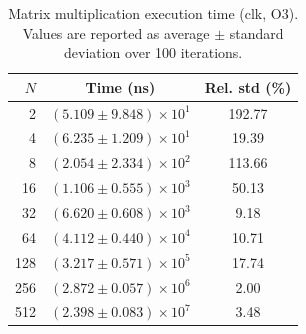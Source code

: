 \begin{table}[ht]
    \centering
    \caption{Matrix multiplication execution time (clk, O3). Values are reported as average $\pm$ standard deviation over 100 iterations.}
    \label{tab:mm-clk-o3}
    \begin{tabular}{rcc}
        \hline
        $N$ & Time (ns) & Rel. std (\%) \\
        \hline
        2 & $(5.109 \pm 9.848) \times 10^{1}$ & 192.77 \\
        4 & $(6.235 \pm 1.209) \times 10^{1}$ & 19.39 \\
        8 & $(2.054 \pm 2.334) \times 10^{2}$ & 113.66 \\
        16 & $(1.106 \pm 0.555) \times 10^{3}$ & 50.13 \\
        32 & $(6.620 \pm 0.608) \times 10^{3}$ & 9.18 \\
        64 & $(4.112 \pm 0.440) \times 10^{4}$ & 10.71 \\
        128 & $(3.217 \pm 0.571) \times 10^{5}$ & 17.74 \\
        256 & $(2.872 \pm 0.057) \times 10^{6}$ & 2.00 \\
        512 & $(2.398 \pm 0.083) \times 10^{7}$ & 3.48 \\
        \hline
    \end{tabular}
\end{table}
